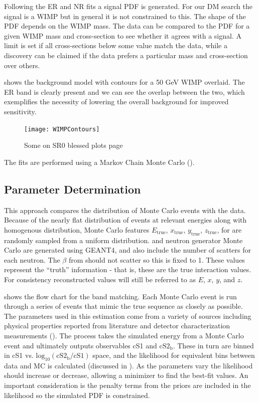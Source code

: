 Following the ER and NR fits a signal PDF is generated.  For our DM search the
signal is a WIMP but in general it is not constrained to this.  The shape of the PDF depends on the WIMP mass.  The data can be compared
to the PDF for a given WIMP mass and cross-section to see whether it agrees with a signal.  A limit is set if all cross-sections below
some value match the data, while a discovery can be claimed if the data prefers a particular mass and cross-section over others.

 shows the background model with contours for a 50 GeV WIMP overlaid.  The ER band is clearly
present and we can see the overlap between the two, which exemplifies the necessity of lowering the overall background for improved
sensitivity.

\begin{figure}
\centering
\texttt{[image: WIMPContours]}
\caption{Some on SR0 blessed plots page}
\label{fig:er_nr_calibrations_wimp_contours}
\end{figure}

The fits are performed using a Markov Chain Monte Carlo ().



\subsection{Parameter Determination}
\label{subsec:er_nr_calibrations_parameter_determ}
This approach compares the distribution of Monte Carlo events with the data.  Because of the nearly flat distribution of events at relevant
energies along with homogenous distribution, Monte Carlo features $E_{\mathrm{true}}$, $x_{\mathrm{true}}$, $y_{\mathrm{true}}$,
$z_{\mathrm{true}}$, for  are randomly sampled from a
uniform distribution.   and neutron generator Monte Carlo are generated using GEANT4, and also include the number of
scatters for each neutron.  The $\beta$ from  should not scatter so this is fixed to 1.  These values represent the ``truth''
information - that is, these are the true interaction values.  For consistency reconstructed values will still be referred to as $E$, $x$,
$y$, and $z$.

 shows the flow chart for the band matching.  Each Monte Carlo event is run
through a series of events that mimic the true sequence as closely as possible.  The parameters used in this estimation come from
a variety of sources including physical properties reported from literature and detector characterization measurements
().  The process takes the simulated energy from a Monte Carlo event and ultimately outputs observables cS1 and
$\mathrm{cS2_b}$.  These in turn are binned in cS1 vs. $\mathrm{log_{10}(cS2_b / cS1)}$ space, and the likelihood for equivalent bins
between data and MC is calculated (discussed in ).  As the parameters vary the likelihood
should increase or decrease, allowing a minimizer to find the best-fit values.  An important consideration is the penalty terms from the
priors are included in the likelihood so the simulated PDF is constrained.

